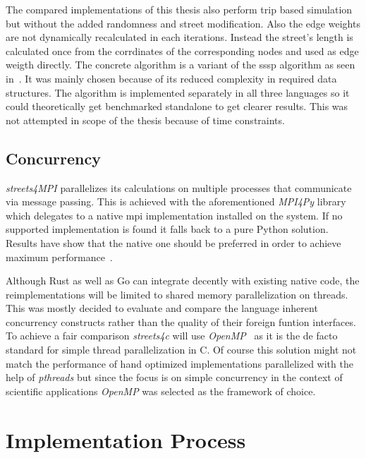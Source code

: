 The compared implementations of this thesis also perform trip based simulation but without the added randomness and street modification. Also the edge weights are not dynamically recalculated in each iterations. Instead the street's length is calculated once from the corrdinates of the corresponding nodes and used as edge weigth directly. The concrete algorithm is a variant of the  \gls{sssp} algorithm as seen in~\cite[p. 16]{dijkstra_utcs}. It was mainly chosen because of its reduced complexity in required data structures. The algorithm is implemented separately in all three languages so it could theoretically get benchmarked standalone to get clearer results. This was not attempted in scope of the thesis because of time constraints.

\subsection*{Concurrency}
\label{subsec:Concept::Differences::Concurrency}

\textit{streets4MPI} parallelizes its calculations on multiple processes that communicate via message passing. This is achieved with the aforementioned \textit{MPI4Py} library which delegates to a native \gls{mpi} implementation installed on the system. If no supported implementation is found it falls back to a pure Python solution. Results have show that the native one should be preferred in order to achieve maximum performance~\cite{streets_report}.

Although Rust as well as Go can integrate decently with existing native code, the reimplementations will be limited to shared memory parallelization on threads. This was mostly decided to evaluate and compare the language inherent concurrency constructs rather than the quality of their foreign funtion interfaces. To achieve a fair comparison \textit{streets4c} will use \textit{OpenMP}~ as it is the de facto standard for simple thread parallelization in C. Of course this solution might not match the performance of hand optimized implementations parallelized with the help of \textit{pthreads} but since the focus is on simple concurrency in the context of scientific applications \textit{OpenMP} was selected as the framework of choice.

\section{Implementation Process}
\label{sec:Concept::Implementation}

